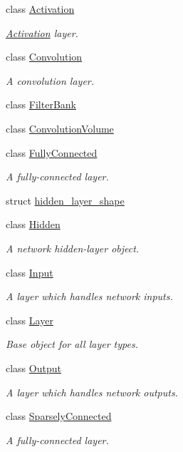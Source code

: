 \begin{DoxyCompactItemize}
\item 
class \hyperlink{classffnn_1_1layer_1_1_activation}{Activation}
\begin{DoxyCompactList}\small\item\em \hyperlink{classffnn_1_1layer_1_1_activation}{Activation} layer. \end{DoxyCompactList}\item 
class \hyperlink{classffnn_1_1layer_1_1_convolution}{Convolution}
\begin{DoxyCompactList}\small\item\em A convolution layer. \end{DoxyCompactList}\item 
class \hyperlink{classffnn_1_1layer_1_1_filter_bank}{Filter\-Bank}
\item 
class \hyperlink{classffnn_1_1layer_1_1_convolution_volume}{Convolution\-Volume}
\item 
class \hyperlink{classffnn_1_1layer_1_1_fully_connected}{Fully\-Connected}
\begin{DoxyCompactList}\small\item\em A fully-\/connected layer. \end{DoxyCompactList}\item 
struct \hyperlink{structffnn_1_1layer_1_1hidden__layer__shape}{hidden\-\_\-layer\-\_\-shape}
\item 
class \hyperlink{classffnn_1_1layer_1_1_hidden}{Hidden}
\begin{DoxyCompactList}\small\item\em A network hidden-\/layer object. \end{DoxyCompactList}\item 
class \hyperlink{classffnn_1_1layer_1_1_input}{Input}
\begin{DoxyCompactList}\small\item\em A layer which handles network inputs. \end{DoxyCompactList}\item 
class \hyperlink{classffnn_1_1layer_1_1_layer}{Layer}
\begin{DoxyCompactList}\small\item\em Base object for all layer types. \end{DoxyCompactList}\item 
class \hyperlink{classffnn_1_1layer_1_1_output}{Output}
\begin{DoxyCompactList}\small\item\em A layer which handles network outputs. \end{DoxyCompactList}\item 
class \hyperlink{classffnn_1_1layer_1_1_sparsely_connected}{Sparsely\-Connected}
\begin{DoxyCompactList}\small\item\em A fully-\/connected layer. \end{DoxyCompactList}\end{DoxyCompactItemize}
